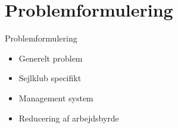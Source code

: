 \section{Problemformulering}

\begin{frame}{Problemformulering}
  
  \begin{itemize}
    \item Generelt problem
    
    \item Sejlklub specifikt
    
    \item Management system
    
    \item Reducering af arbejdsbyrde
    
  \end{itemize}
\end{frame}
